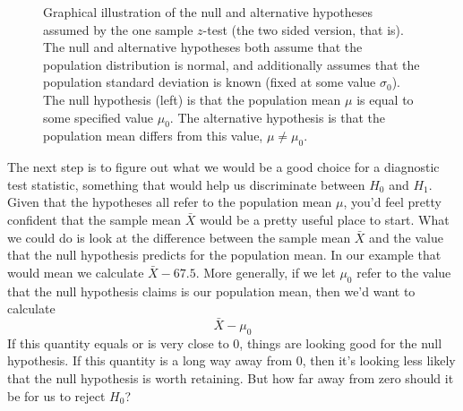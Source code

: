 \begin{figure}[htb]
\begin{center}
\caption{Graphical illustration of the null and alternative hypotheses assumed by the one sample $z$-test (the two sided version, that is). The null and alternative hypotheses both assume that the population distribution is normal, and additionally assumes that the population standard deviation is known (fixed at some value $\sigma_0$). The null hypothesis (left) is that the population mean $\mu$ is equal to some specified value $\mu_0$. The alternative hypothesis is that the population mean differs from this value, $\mu \neq \mu_0$.}
\HR
\label{fig:ztesthyp}
\end{center}
\end{figure}

The next step is to figure out what we would be a good choice for a diagnostic test statistic, something that would help us discriminate between $H_0$ and $H_1$. Given that the hypotheses all refer to the population mean $\mu$, you'd feel pretty confident that the sample mean $\bar{X}$ would be a pretty useful place to start. What we could do is look at the difference between the sample mean $\bar{X}$ and the value that the null hypothesis predicts for the population mean. In our example that would mean we calculate $\bar{X} - 67.5$. More generally, if we let $\mu_0$ refer to the value that the null hypothesis claims is our population mean, then we'd want to calculate
$$
\bar{X} - \mu_0
$$
If this quantity equals or is very close to 0, things are looking good for the null hypothesis. If this quantity is a long way away from 0, then it's looking less likely that the null hypothesis is worth retaining. But how far away from zero should it be for us to reject $H_0$? 

